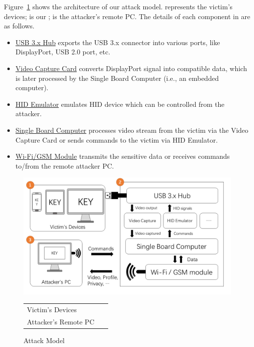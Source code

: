Figure~\ref{fig:attack_model} shows the architecture of our attack model.  represents the victim's devices;  is our \tool;  is the attacker's remote PC. The details of each component in \tool are as follows.


\begin{itemize}
	
	\item\underline{USB 3.x Hub} exports the USB 3.x connector into various ports, like DisplayPort, USB 2.0 port, etc.
	
	\item\underline{Video Capture Card} converts DisplayPort signal into compatible data, which is later processed by the Single Board Computer (i.e., an embedded computer).
	
	\item\underline{HID Emulator} emulates HID device which can be controlled from the attacker.
	
	\item\underline{Single Board Computer} processes video stream from the victim via the Video Capture Card or sends commands to the victim via HID Emulator.
	
	\item\underline{Wi-Fi/GSM Module} transmits the sensitive data or receives commands to/from the remote attacker PC.

\end{itemize}


\begin{figure}[t]
	\centering
	\includegraphics[width=\linewidth]{./Figs/attack_model.png}

	\begin{tabular}{ll}
	\circled[text=white,fill=myyellow]{\footnotesize{1}} Victim's Devices    &\circled[text=white,fill=myyellow]{\footnotesize{2}}~\tool\\
	\circled[text=white,fill=myyellow]{\footnotesize{3}} Attacker's Remote PC
	\end{tabular}

	\caption{Attack Model}%
	\label{fig:attack_model}
\end{figure}

